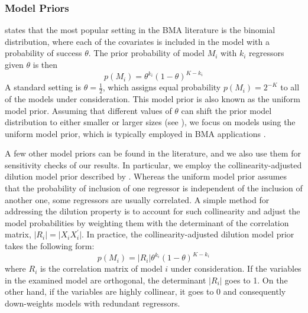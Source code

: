 \documentclass[a4paper,11pt]{article}
\begin{document}
\subsubsection*{Model Priors}
\citet{MoralBenito2012} states that the most popular setting in the \ac{BMA} literature is the binomial distribution, where each of the covariates is included in the model with a probability of success $\theta$. The prior probability of model $M_{i}$ with $k_{i}$ regressors given $\theta$ is then
\begin{equation}
p(M_{i})=\theta^{k_{i}}(1-\theta)^{K-k_{i}}
\end{equation}
A standard setting is $\theta=\frac{1}{2}$, which assigns equal probability $p(M_{i}) = 2^{-K}$ to all of the models under consideration. This model prior is also known as the uniform model prior. Assuming that different values of $\theta$ can shift the prior model distribution to either smaller or larger sizes (see \citet{Zeugner2011}), we focus on models using the uniform model prior, which is typically employed in \ac{BMA} applications \citet{Fernandezetal2001}.

A few other model priors can be found in the literature, and we also use them for sensitivity checks of our results. In particular, we employ the collinearity-adjusted dilution model prior described by \citet{george2010}. Whereas the uniform model prior assumes that the probability of inclusion of one regressor is independent of the inclusion of another one, some regressors are usually correlated. A simple method for addressing the dilution property is to account for such collinearity and adjust the model probabilities by weighting them with the determinant of the correlation matrix, $\vert R_{i} \vert = \vert X_{i}^{}X_{i}^{\prime} \vert$. In practice, the collinearity-adjusted dilution model prior takes the following form:
%
\begin{equation}
p(M_{i})=\vert R_{i} \vert \theta^{k_{i}}(1-\theta)^{K-k_{i}}
\end{equation}
%
where $R_{i}$ is the correlation matrix of model $i$ under consideration. If the variables in the examined model are orthogonal, the determinant $\vert R_{i} \vert$ goes to 1. On the other hand, if the variables are highly collinear, it goes to 0 and consequently down-weights models with redundant regressors.
\end{document}
